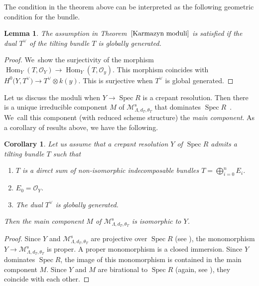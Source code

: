 \documentclass[pdftex]{sigma}
\DeclareMathOperator{\Hom}{Hom}
\DeclareMathOperator{\Spec}{Spec}
\newcommand{\stsh}{\mathcal{O}}
\numberwithin{equation}{section}
\newtheorem{Corollary}[Theorem]{Corollary}
\newtheorem{Lemma}[Theorem]{Lemma}
\begin{document}
The condition in the theorem above can be interpreted as the following geometric condition for the bundle.

\begin{Lemma}
The assumption in Theorem~$\ref{Karmazyn moduli}$ is satisfied if the dual $T^{\vee}$ of the tilting bundle $T$ is globally generated.
\end{Lemma}

\begin{proof}
We~show the surjectivity of the morphism
$\Hom_Y(T, \stsh_Y) \to \Hom_Y(T, \stsh_y)$.
This morphism coincides with $H^0\big(Y, T^{\vee}\big) \to T^{\vee} \otimes k(y)$.
This is surjective when $T^{\vee}$ is global generated.
\end{proof}

Let us discuss the moduli when $Y \to \Spec R$ is a crepant resolution.
Then there is a unique irreducible component $M$ of $\mathcal{M}_{\Lambda, d_T, \theta_T}^{\mathrm{s}}$ that dominates $\Spec R$~\cite{VdB04b}.
We~call this component (with reduced scheme structure) the \textit{main component}.
As a corollary of results above, we have the following.

\begin{Corollary} \label{cor moduli tilting main comp}
Let us assume that a crepant resolution $Y$ of $\Spec R$ admits a tilting bundle $T$ such that
\begin{enumerate}\itemsep=0pt
\item[$(a)$] $T$ is a direct sum of non-isomorphic indecomposable bundles $T = \bigoplus_{i=0}^n E_i$.
\item[$(b)$] $E_0 = \stsh_Y$.
\item[$(c)$] The dual $T^{\vee}$ is globally generated.
\end{enumerate}
Then the main component $M$ of $\mathcal{M}_{\Lambda, d_T, \theta_T}^{\mathrm{s}}$ is isomorphic to $Y$.
\end{Corollary}

\begin{proof}
Since $Y$ and $\mathcal{M}_{\Lambda, d_T, \theta_T}^{\mathrm{s}}$ are projective over $\Spec R$ (see \cite[Section 6]{VdB04b}),
the monomorphism $Y \to \mathcal{M}_{\Lambda, d_T, \theta_T}^{\mathrm{s}}$ is proper.
A proper monomorphism is a closed immersion.
Since $Y$ dominates $\Spec R$, the image of this monomorphism is contained in the main component $M$.
Since $Y$ and $M$ are birational to $\Spec R$ (again, see \cite[Section~6]{VdB04b}), they coincide with each other.
\end{proof}
\end{document}
